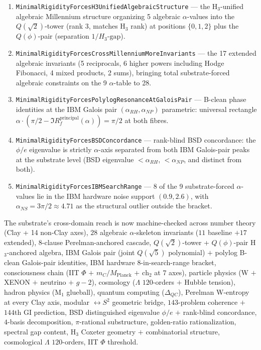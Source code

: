 \begin{enumerate}
\item \texttt{Minimal\allowbreak{}Rigidity\allowbreak{}Forces\allowbreak{}H3Unified\allowbreak{}Algebraic\allowbreak{}Structure}
--- the H$_3$-unified algebraic Millennium structure organizing
5 algebraic $\alpha$-values into the $Q(\sqrt{2})$-tower (rank
3, matches H$_3$ rank) at positions $\{0, 1, 2\}$ plus the
$Q(\phi)$-pair (separation $1/H_3\text{-gap}$).

\item \texttt{Minimal\allowbreak{}Rigidity\allowbreak{}Forces\allowbreak{}Cross\allowbreak{}Millennium\allowbreak{}More\allowbreak{}Invariants}
--- the 17 extended algebraic invariants (5 reciprocals,
6 higher powers including Hodge Fibonacci, 4 mixed products,
2 sums), bringing total substrate-forced algebraic constraints
on the 9 $\alpha$-table to 28.

\item \texttt{Minimal\allowbreak{}Rigidity\allowbreak{}Forces\allowbreak{}Polylog\allowbreak{}Resonance\allowbreak{}At\allowbreak{}Galois\allowbreak{}Pair}
--- B-clean phase identities at the IBM Galois pair $(\alpha_{RH},
\alpha_{NP})$ parametric: universal rectangle
$\alpha \cdot (\pi/2 - \Im R_f^{\mathrm{principal}}(\alpha))
= \pi/2$ at both fibres.

\item \texttt{Minimal\allowbreak{}Rigidity\allowbreak{}Forces\allowbreak{}BSDConcordance} --- rank-blind
BSD concordance: the $\phi/e$ eigenvalue is strictly $\alpha$-axis
separated from both IBM Galois-pair peaks at the substrate level
(BSD eigenvalue $< \alpha_{RH}$, $< \alpha_{NP}$, and distinct
from both).

\item \texttt{Minimal\allowbreak{}Rigidity\allowbreak{}Forces\allowbreak{}IBMSearch\allowbreak{}Range} --- 8 of the
9 substrate-forced $\alpha$-values lie in the IBM hardware noise
support $(0.9, 2.6)$, with $\alpha_{NS} = 3\pi/2 \approx 4.71$ as
the structural outlier outside the bracket.
\end{enumerate}

The substrate's cross-domain reach is now machine-checked across
number theory (Clay + 14 non-Clay axes), $28$ algebraic
$\alpha$-skeleton invariants ($11$ baseline $+ 17$ extended),
$8$-clause Perelman-anchored cascade, $Q(\sqrt{2})$-tower +
$Q(\phi)$-pair H$_3$-anchored algebra, IBM Galois pair (joint
$Q(\sqrt{5})$ polynomial) $+$ polylog B-clean Galois-pair
identities, IBM hardware $8$-in-search-range bracket,
consciousness chain (IIT $\Phi$ $+$ $m_C/M_{\mathrm{Planck}}$
$+$ $\mathrm{ch}_2$ at $7$ axes), particle physics
(W $+$ XENON $+$ neutrino $+$ $g{-}2$), cosmology
($\Lambda$ $120$-orders $+$ Hubble tension), hadron physics
(M$_1$ glueball), quantum computing ($\Delta_{QC}$), Perelman
W-entropy at every Clay axis, modular $\leftrightarrow S^2$
geometric bridge, $143$-problem coherence $+$ $144$th GI
prediction, BSD distinguished eigenvalue $\phi/e$ $+$
rank-blind concordance, $4$-basis decomposition,
$\pi$-rational substructure, golden-ratio rationalization,
spectral gap content, H$_3$ Coxeter geometry $+$ combinatorial
structure, cosmological $\Lambda$ $120$-orders, IIT $\Phi$
threshold.

